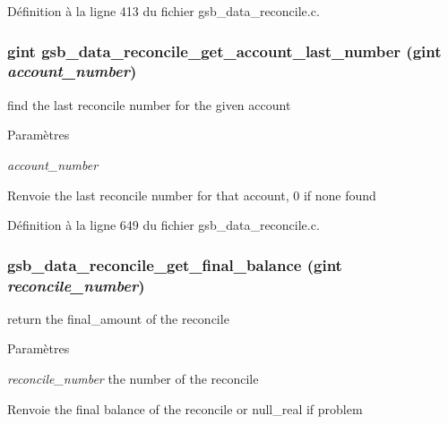 Définition à la ligne 413 du fichier gsb\_\-data\_\-reconcile.c.

\subsubsection[{gsb\_\-data\_\-reconcile\_\-get\_\-account\_\-last\_\-number}]{\setlength{\rightskip}{0pt plus 5cm}gint gsb\_\-data\_\-reconcile\_\-get\_\-account\_\-last\_\-number (gint {\em account\_\-number})}\label{gsb__data__reconcile_8c_a2ab9538da63a10bec22e1efe1cd3f19f}
find the last reconcile number for the given account


\begin{DoxyParams}{Paramètres}
\item[{\em account\_\-number}]\end{DoxyParams}
\begin{DoxyReturn}{Renvoie}
the last reconcile number for that account, 0 if none found 
\end{DoxyReturn}


Définition à la ligne 649 du fichier gsb\_\-data\_\-reconcile.c.

\subsubsection[{gsb\_\-data\_\-reconcile\_\-get\_\-final\_\-balance}]{ gsb\_\-data\_\-reconcile\_\-get\_\-final\_\-balance (gint {\em reconcile\_\-number})}\label{gsb__data__reconcile_8c_a261a4e1eacb9c6517df7daa4afa879bb}
return the final\_\-amount of the reconcile


\begin{DoxyParams}{Paramètres}
\item[{\em reconcile\_\-number}]the number of the reconcile\end{DoxyParams}
\begin{DoxyReturn}{Renvoie}
the final balance of the reconcile or null\_\-real if problem 
\end{DoxyReturn}


